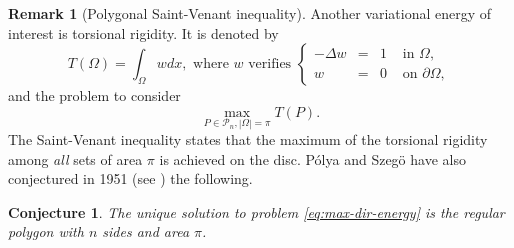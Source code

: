 \documentclass[11pt]{article}
\numberwithin{equation}{section}\newtheorem*{jepEnonce}{\jepEnonceTitle}\newenvironment{enonce*}[1]{\def\jepEnonceTitle{#1}\jepEnonce}{\endjepEnonce}\newtheorem*{conj*}{Conjecture}
\theoremstyle{plain}
\theoremstyle{definition}
\newtheorem{rem}[thm]{Remark}
\newcommand{\Pol}[1]{\mathcal P_{#1}}
\begin{document}
\begin{rem}[Polygonal Saint-Venant inequality]
\label{bobu40}
Another variational energy of interest is torsional rigidity. It is denoted by
\begin{equation}
T(\Omega) = \int_\Omega wdx, \text{ where } w \text{ verifies } \left\{\begin{array}{rcll}
-\Delta w & = & 1 & \text{ in }\Omega, \\
w & = & 0 &\text{ on } \partial \Omega,
\end{array}\right.
\label{eq:dirichlet-energy}
\end{equation}
and the problem to consider
\begin{equation}
\max_{P \in \Pol n, |\Omega| = \pi} T(P).
\label{eq:max-dir-energy}
\end{equation}
The Saint-Venant inequality states that the maximum of the torsional rigidity among {\it all} sets of area $\pi$ is achieved on the disc.
Pólya and Szegö have also conjectured in 1951 (see \cite[p.\,158]{PoSz51}) the following.

\begin{conj*}
The unique solution to problem \eqref{eq:max-dir-energy} is the regular polygon with $n$ sides and area $\pi$.
\end{conj*}


\end{rem}
\end{document}
